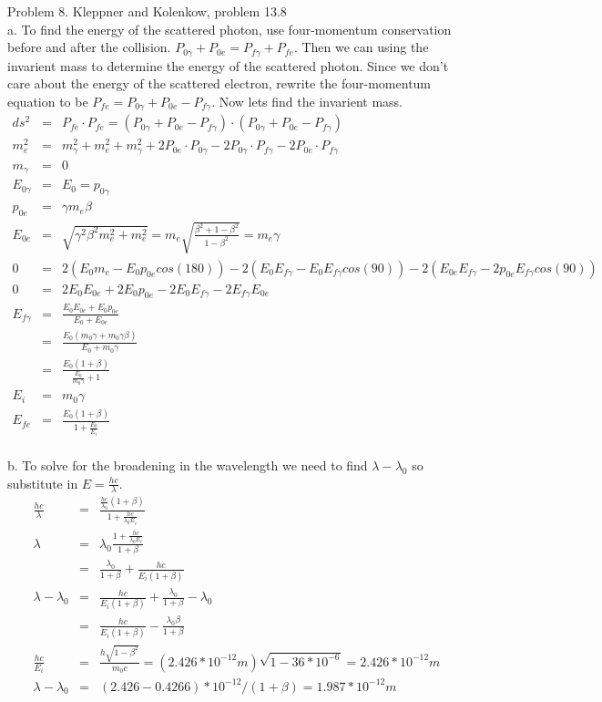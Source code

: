 \documentclass[11pt]{amsart}
\begin{document}
Problem 8. Kleppner and Kolenkow, problem 13.8 \\
a. To find the energy of the scattered photon, use four-momentum conservation before and after the collision. $P_{0\gamma}+P_{0e}=P_{f\gamma}+P_{fe}$. Then we can using the invarient mass to determine the energy of the scattered photon. Since we don't care about the energy of the scattered electron, rewrite the four-momentum equation to be $P_{fe}=P_{0\gamma}+P_{0e}-P_{f\gamma}$. Now lets find the invarient mass. \\
\begin{eqnarray*}
ds^{2} &=& P_{fe}\cdot{P_{fe}} = (P_{0\gamma}+P_{0e}-P_{f\gamma})\cdot{(P_{0\gamma}+P_{0e}-P_{f\gamma})} \\
m_{e}^{2} &=& m_{\gamma}^{2}+m_{e}^{2}+m_{\gamma}^{2}+2P_{0e}\cdot{P_{0\gamma}}-2P_{0\gamma}\cdot{P_{f\gamma}} -2P_{0e}\cdot{P_{f\gamma}} \\
m_{\gamma} &=& 0 \\
E_{0\gamma} &=& E_{0} = p_{0\gamma} \\
p_{0e} &=& \gamma{m_{e}}\beta \\
E_{0e} &=& \sqrt{\gamma^{2}\beta^{2}m_{e}^{2}+m_{e}^{2}} = m_{e}\sqrt{\frac{\beta^{2}+1-\beta^{2}}{1-\beta^{2}}} = m_{e}\gamma \\
0 &=& 2(E_{0}m_{e}-E_{0}p_{0e}cos(180))-2(E_{0}E_{f\gamma}-E_{0}E_{f\gamma}cos(90))-2(E_{0e}E_{f\gamma}-2p_{0e}E_{f\gamma}cos(90)) \\
0 &=& 2E_{0}E_{0e}+2E_{0}p_{0e}-2E_{0}E_{f\gamma}-2E_{f\gamma}E_{0e} \\
E_{f\gamma} &=& \frac{E_{0}E_{0e}+E_{0}p_{0e}}{E_{0}+E_{0e}} \\
&=& \frac{E_{0}(m_{0}\gamma+m_{0}\gamma\beta)}{E_{0}+m_{0}\gamma} \\
&=& \frac{E_{0}(1+\beta)}{\frac{E_{0}}{m_{0}\gamma}+1} \\
E_{i} &=& m_{0}\gamma \\
E_{fe} &=& \frac{E_{0}(1+\beta)}{1+\frac{E_{0}}{E_{i}}} 
\end{eqnarray*} \\
b. To solve for the broadening in the wavelength we need to find $\lambda-\lambda_{0}$ so substitute in $E=\frac{hc}{\lambda}$. \\
\begin{eqnarray*}
\frac{hc}{\lambda} &=& \frac{\frac{hc}{\lambda_{0}}(1+\beta)}{1+\frac{hc}{\lambda_{0}E_{i}}} \\
\lambda &=& \lambda_{0}\frac{1+\frac{hc}{\lambda_{0}E_{i}}}{1+\beta} \\
&=& \frac{\lambda_{0}}{1+\beta}+\frac{hc}{E_{i}(1+\beta)} \\
\lambda -\lambda_{0} &=& \frac{hc}{E_{i}(1+\beta)}+ \frac{\lambda_{0}}{1+\beta}-\lambda_{0} \\
&=&  \frac{hc}{E_{i}(1+\beta)}-\frac{\lambda_{0}\beta}{1+\beta} \\
\frac{hc}{E_{i}} &=& \frac{h\sqrt{1-\beta^{2}}}{m_{0}c} = (2.426*10^{-12}m)\sqrt{1-36*10^{-6}}=2.426*10^{-12}m \\
\lambda -\lambda_{0} &=& (2.426-0.4266)*10^{-12}/(1+\beta) = 1.987*10^{-12}m 
\end{eqnarray*}
\end{document}
